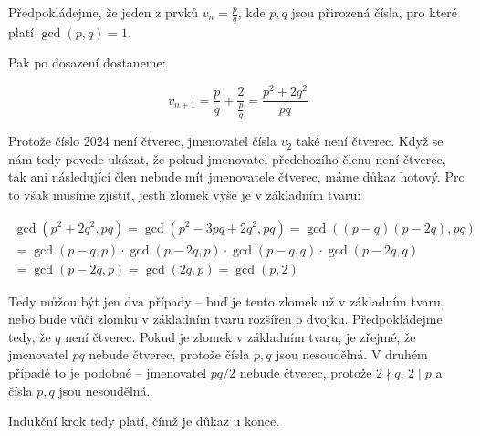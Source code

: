 \documentclass{fkssolpub}
\author{Ondřej Sedláček}
\begin{document}
 

Předpokládejme, že jeden z prvků $v_n = \frac{p}{q}$, kde $p, q$ jsou
přirozená čísla, pro které platí $\gcd(p, q) = 1$.

Pak po dosazení dostaneme:

\[
  v_{n+1} = \frac{p}{q} + \frac{2}{\frac{p}{q}} = \frac{p^2 + 2 q^2}{pq}
\]

Protože číslo 2024 není čtverec, jmenovatel čísla $v_2$ také není čtverec.
Když se nám tedy povede ukázat, že pokud jmenovatel předchozího členu není
čtverec, tak ani následující člen nebude mít jmenovatele čtverec, 
máme důkaz hotový. Pro to však musíme zjistit, jestli zlomek
výše je v základním tvaru:

\begin{gather*}
  \gcd(p^2 + 2 q^2, pq) = \gcd(p^2 - 3pq + 2q^2, pq) = \gcd((p - q)(p - 2q), pq) \\
    = \gcd(p-q, p) \cdot \gcd(p-2q, p) \cdot \gcd(p-q, q) \cdot \gcd(p-2q, q) \\
    = \gcd(p-2q, p) = \gcd(2q, p) = \gcd(p, 2)
\end{gather*}

Tedy můžou být jen dva případy -- buď je tento zlomek už v základním tvaru,
nebo bude vůči zlomku v základním tvaru rozšířen o dvojku. Předpokládejme
tedy, že $q$ není čtverec. Pokud je zlomek v základním tvaru, je zřejmé,
že jmenovatel $pq$ nebude čtverec, protože čísla $p, q$ jsou nesoudělná.
V druhém případě to je podobné -- jmenovatel $pq/2$ nebude čtverec, protože
$2 \nmid q$, $2 \mid p$ a čísla $p, q$ jsou nesoudělná.

Indukční krok tedy platí, čímž je důkaz u konce.
\end{document}
